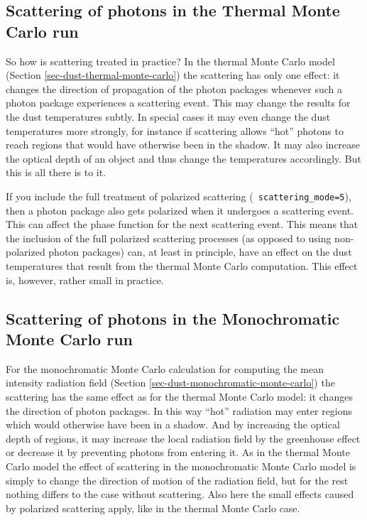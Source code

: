 \documentclass{report}
\begin{document}
\subsection{Scattering of photons in the Thermal Monte Carlo run}
\label{sec-scat-in-therm-mc}
%
So how is scattering treated in practice? In the thermal Monte Carlo model
(Section \ref{sec-dust-thermal-monte-carlo}) the scattering has only one
effect: it changes the direction of propagation of the photon packages
whenever such a photon package experiences a scattering event. This may
change the results for the dust temperatures subtly. In special cases it may
even change the dust temperatures more strongly, for instance if scattering
allows ``hot'' photons to reach regions that would have otherwise been in
the shadow. It may also increase the optical depth of an object and thus
change the temperatures accordingly. But this is all there is to it.

If you include the full treatment of polarized scattering ({\small\tt
  scattering\_mode=5}), then a photon package also gets polarized when it
undergoes a scattering event. This can affect the phase function for the
next scattering event. This means that the inclusion of the full polarized
scattering processes (as opposed to using non-polarized photon packages)
can, at least in principle, have an effect on the dust temperatures that
result from the thermal Monte Carlo computation. This effect is, however,
rather small in practice. 


\subsection{Scattering of photons in the Monochromatic Monte Carlo run}
\label{sec-scat-in-mono-mc}
%
For the monochromatic Monte Carlo calculation for computing the mean
intensity radiation field (Section \ref{sec-dust-monochromatic-monte-carlo})
the scattering has the same effect as for the thermal Monte Carlo model: it
changes the direction of photon packages. In this way ``hot'' radiation may
enter regions which would otherwise have been in a shadow. And by increasing
the optical depth of regions, it may increase the local radiation field by
the greenhouse effect or decrease it by preventing photons from entering
it. As in the thermal Monte Carlo model the effect of scattering in the
monochromatic Monte Carlo model is simply to change the direction of motion
of the radiation field, but for the rest nothing differs to the case without
scattering. Also here the small effects caused by polarized scattering apply,
like in the thermal Monte Carlo case.
\end{document}
